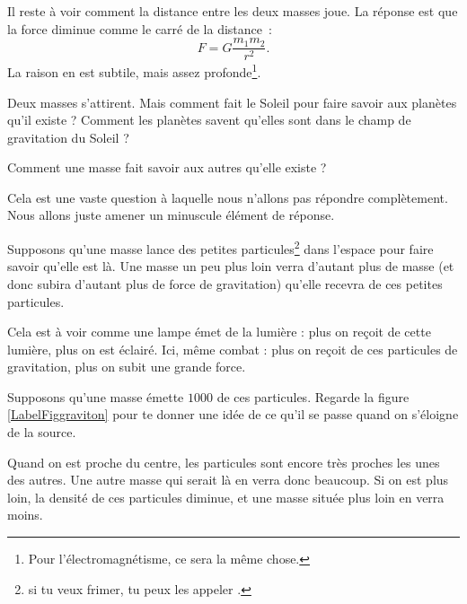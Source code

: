 Il reste à voir comment la distance entre les deux masses joue. La réponse est que la force diminue comme le carré de la distance~:
\begin{equation}	\label{PgForceGrav}
	F=G\frac{ m_1m_2 }{ r^2 }.
\end{equation}
La raison en est subtile, mais assez profonde\footnote{Pour l'électromagnétisme, ce sera la même chose.}. 


\begin{pourquoidonc}
	Deux masses s'attirent. Mais comment fait le Soleil pour faire savoir aux planètes qu'il existe ? Comment les planètes savent qu'elles sont dans le champ de gravitation du Soleil ?

	Comment une masse fait savoir aux autres qu'elle existe ?
\end{pourquoidonc}
Cela est une vaste question à laquelle nous n'allons pas répondre complètement. Nous allons juste amener un minuscule élément de réponse. 

Supposons qu'une masse lance des petites particules\footnote{si tu veux frimer, tu peux les appeler .} dans l'espace pour faire savoir qu'elle est là. Une masse un peu plus loin \og verra\fg{} d'autant plus de masse (et donc subira d'autant plus de force de gravitation) qu'elle recevra de ces petites particules.

Cela est à voir comme une lampe émet de la lumière : plus on reçoit de cette lumière, plus on est éclairé. Ici, même combat : plus on reçoit de ces particules de gravitation, plus on subit une grande force.

Supposons qu'une masse émette $1000$ de ces particules. Regarde la figure \ref{LabelFiggraviton} pour te donner une idée de ce qu'il se passe quand on s'éloigne de la source.
\newcommand{\CaptionFiggraviton}{Les petites particules de gravitation. Plus on s'éloigne, plus elles s'espacent les unes des autres}


Quand on est proche du centre, les particules sont encore très proches les unes des autres. Une autre masse qui serait là en verra donc beaucoup. Si on est plus loin, la densité de ces particules diminue, et une masse située plus loin en verra moins. 

